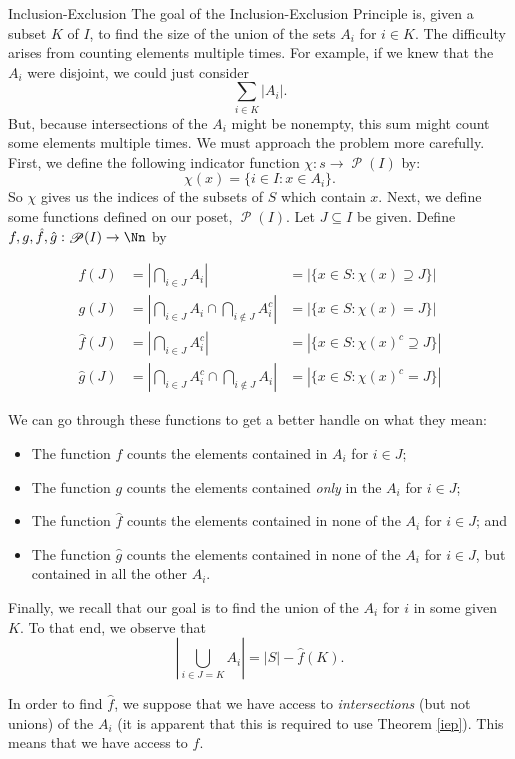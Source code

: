 \documentclass[12pt]{pom_thesis}
\DeclareMathOperator{\ps}{\mathscr{P}}
\begin{document}
\begin{chapter}{Inclusion-Exclusion}
The goal of the Inclusion-Exclusion Principle is, given a subset $K$ of $I$, to find the size of the union of the sets $A_i$ for $i \in K$. The difficulty arises from counting elements multiple times. For example, if we knew that the $A_i$ were disjoint, we could just consider
\[
\sum_{i \in K}\left|A_i\right|.
\]
But, because intersections of the $A_i$ might be nonempty, this sum might count some elements multiple times. We must approach the problem more carefully. First, we define the following indicator function $\chi: s \rightarrow \ps(I)$ by:
\[
\chi(x) = \{i \in I : x \in A_i\}.
\]
So $\chi$ gives us the indices of the subsets of $S$ which contain $x$.  
Next, we define some functions defined on our poset, $\ps(I)$.
Let $J \subseteq I$ be given. Define $f,g,\hat{f}, \hat{g}:\ps(I) \rightarrow \Nn$ by

\begin{align*}
f(J) &= \left| \bigcap_{i \in J} A_i\right| &= |\{x \in S: \chi(x) \supseteq J\}|\\
g(J) &= \left| \bigcap_{i \in J} A_i \cap \bigcap_{i \notin J} A_i^c\right| &= |\{x \in S: \chi(x) = J\}|\\
\hat{f}(J) &= \left| \bigcap_{i \in J} A_i^c\right| &= |\{x \in S: \chi(x)^c \supseteq J\}|\\
\hat{g}(J) &= \left|\bigcap_{i \in J} A_i^c \cap \bigcap_{i \notin J} A_i \right| &= |\{x \in S: \chi(x)^c = J\}|
\end{align*}

We can go through these functions to get a better handle on what they mean:
\begin{itemize}
\item The function $f$ counts the elements contained in $A_i$ for $i \in J$;
\item The function $g$ counts the elements contained \emph{only} in the $A_i$ for $i \in J$;
\item The function $\hat{f}$ counts the elements contained in none of the $A_i$ for $i \in J$; and
\item The function $\hat{g}$ counts the elements contained in none of the $A_i$ for $i \in J$, but contained in all the other $A_i$.
\end{itemize}
Finally, we recall that our goal is to find the union of the $A_i$ for $i$ in some given $K$. To that end, we observe that
\[
\left| \bigcup_{i \in J=K} A_i \right| = |S| - \hat{f}(K).
\]

In order to find $\hat{f}$, we suppose that we have access to \emph{intersections} (but not unions) of the $A_i$ (it is apparent that this is required to use Theorem \ref{iep}). This means that we have access to $f$. 


\end{chapter}
\end{document}
